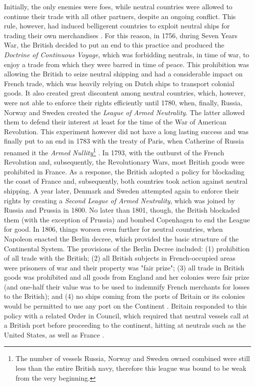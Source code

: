 \documentclass[12pt,a4paper,notitlepage,english]{article}
\begin{document}
Initially, the only enemies were foes, while neutral countries were allowed to continue their trade with all other partners, despite an ongoing conflict. This rule, however, had induced belligerent countries to exploit neutral ships for trading their own merchandises \citep{carriere1973negociants}. For this reason, in 1756, during Seven Years War, the British decided to put an end to this practice and produced the \textit{Doctrine of Continuous Voyage}, which was forbidding neutrals, in time of war, to enjoy a trade from which they were barred in time of peace. This prohibition was allowing the British to seize neutral shipping and had a considerable impact on French trade, which was heavily relying on Dutch ships to transport colonial goods. It also created great discontent among neutral countries, which, however, were not able to enforce their rights efficiently until 1780, when, finally, Russia, Norway and Sweden created the \textit{League of Armed Neutrality}. The latter allowed them to defend their interest at least for the time of the War of American Revolution. This experiment however did not have a long lasting success and was finally put to an end in 1783 with the treaty of Paris, when Catherine of Russia renamed it the \textit{Armed Nullity}\footnote{The number of vessels Russia, Norway and Sweden owned combined were still less than the entire British navy, therefore this league was bound to be weak from the very beginning.} \citep{griffiths1971american}. In 1793, with the outburst of the French Revolution and, subsequently, the Revolutionary Wars, most British goods were prohibited in France. As a response, the British adopted a policy for blockading the coast of France and, subsequently, both countries took action against neutral shipping. A year later, Denmark and Sweden attempted again to enforce their rights by creating a \textit{Second League of Armed Neutrality}, which was joined by Russia and Prussia in 1800. No later than 1801, though, the British blockaded them (with the exception of Prussia) and bombed Copenhagen to end the League for good. In 1806, things worsen even further for neutral countries, when Napoleon enacted the Berlin decree, which provided the basic structure of the Continental System. The provisions of the Berlin Decree included: (1) prohibition of all trade with the British; (2) all British subjects in French-occupied areas were prisoners of war and their property was "fair prize"; (3) all trade in British goods was prohibited and all goods from England and her colonies were fair prize (and one-half their value was to be used to indemnify French merchants for losses to the British); and (4) no ships coming from the ports of Britain or its colonies would be permitted to use any port on the Continent \citep{davis2006naval}. Britain responded to this policy with a related Order in Council, which required that neutral vessels call at a British port before proceeding to the continent, hitting at neutrals such as the United States, as well as France \citep{davis2006naval}.
\end{document}
